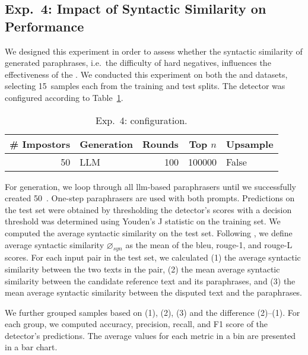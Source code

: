 \subsection{Exp.\ 4: Impact of Syntactic Similarity on \impApprTitle{} Performance}
\label{sec:syn_sim_impact_}

We designed this experiment in order to assess whether the syntactic similarity of generated paraphrases, i.e.\ the difficulty of hard negatives, influences the effectiveness of the \impAppr{}.
We conducted this experiment on both the \dataBlog{} and \dataStudent{} datasets, selecting 15~samples each from the training and test splits. 
The detector was configured according to Table~\ref{tab:imp_syn_sim_config}.

\begin{table}[h]
\centering\small
\caption{Exp.\ 4: \impAppr{} configuration.}
\label{tab:imp_syn_sim_config}
\begin{tabular}{@{}rlrrl@{}}   %
\toprule
\# Impostors & Generation & Rounds & Top $n$ & Upsample \\
\midrule
50 & LLM & 100 & \num{100000} & False \\
\bottomrule
\end{tabular}%
\end{table}

For generation, we loop through all \ac{llm}-based paraphrasers until we successfully created 50~\imps{}.
One-step paraphrasers are used with both prompts.
Predictions on the test set were obtained by thresholding the detector’s scores with a decision threshold was determined using Youden’s J statistic on the training set.
We computed the average syntactic similarity on the test set. 
Following \citet{gohsen_captions_2023}, we define average syntactic similarity $\diameter_{syn}$ as the mean of the \ac{bleu}, \ac{rouge}-1, and \ac{rouge}-L scores. 
For each input pair in the test set, we calculated
(1) the average syntactic similarity between the two texts in the pair, (2) the mean average syntactic similarity between the candidate reference text and its paraphrases, and (3) the mean average syntactic similarity between the disputed text and the paraphrases.

We further grouped samples based on (1), (2), (3) and the difference (2)–(1). 
For each group, we computed accuracy, precision, recall, and F1 score of the detector’s predictions. 
The average values for each metric in a bin are presented in a bar chart.

